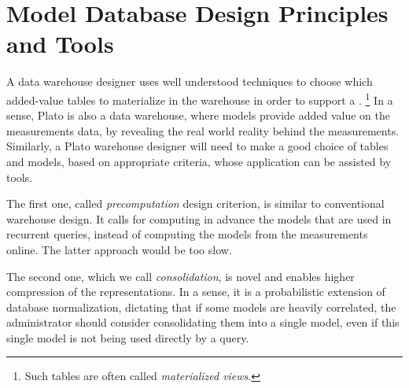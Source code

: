 \section{Model Database Design Principles and Tools}
\label{sec:design}
A data warehouse designer uses well understood techniques to choose which added-value tables to materialize in the warehouse in order to support a .%
\footnote{Such tables are often called {\em materialized views}.}
In a sense, Plato is also a data warehouse, where models provide added value on the measurements data, by revealing the real world reality behind the measurements. Similarly, a Plato warehouse designer will need to make a good choice of tables and models, based on appropriate criteria, whose application can be assisted by tools. 

The first one, called {\em precomputation} design criterion, is similar to conventional warehouse design. It calls for computing in advance the models that are used in recurrent queries, instead of computing the models from the measurements online. The latter approach would be too slow.

The second one, which we call {\em consolidation}, is novel and enables higher compression of the representations. In a sense, it is a probabilistic extension of database normalization, dictating that if some models are heavily correlated, the administrator should consider consolidating them into a single model, even if this single model is not being used directly by a query. 

